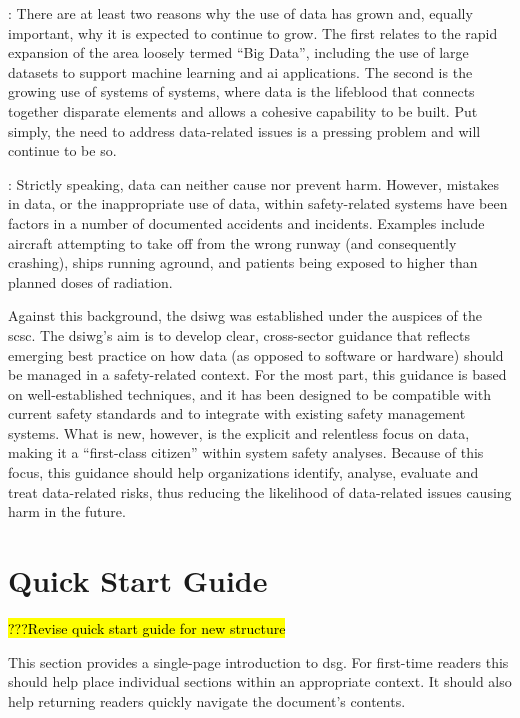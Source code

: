 : There are at least two reasons why the use of data has grown and, equally important, why it is expected to continue to grow. The  first relates to the rapid expansion of the area loosely termed ``Big Data'', including the use of large \glspl{dataset} to support machine learning and \gls{ai} applications. The second is the growing use of systems of systems, where data is the lifeblood that connects together disparate elements and allows a cohesive capability to be built. Put simply, the need to address data-related issues is a pressing problem and will continue to be so.

: Strictly speaking,
data can neither cause nor prevent harm.
However, mistakes in data, or the inappropriate use of data, within safety-related systems have been factors in a number of documented accidents and incidents. Examples include aircraft attempting to take off from the wrong runway (and consequently crashing), ships running aground, and patients being exposed to higher than planned doses of radiation.

Against this background, the \gls{dsiwg} was established under the auspices of the \gls{scsc}. The \gls{dsiwg}'s aim is to develop clear, cross-sector guidance that reflects emerging best practice on how data (as opposed to software or hardware) should be managed in a safety-related context.
For the most part, this guidance is based on well-established techniques,
and it has been designed to be compatible with current safety standards and to integrate with existing safety management systems.
What is new, however, is the explicit and relentless focus on data, making it a ``first-class citizen'' within system safety analyses.
Because of this focus, this guidance should help organizations identify, analyse, evaluate and treat data-related risks, thus reducing the likelihood of data-related issues causing harm in the future.

\clearpage
\section*{Quick Start Guide}
\hl{???Revise quick start guide for new structure}
\pagestyle{ContinuationPageFrontMatter}


This section provides a single-page introduction to \gls{dsg}. For first-time readers this should help place individual sections within an appropriate context. It should also help returning readers quickly navigate the document's contents.

